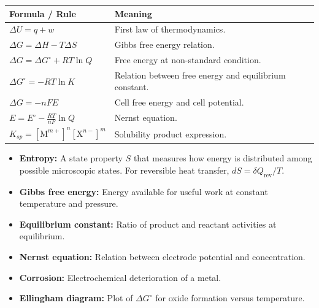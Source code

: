 \documentclass[12pt,a4paper]{article}
\begin{document}
\begin{tcolorbox}[formulabox, title={Key Formulas at a Glance}]
\begin{tabularx}{\linewidth}{|B{4.0cm}|Y|}
\hline
\textbf{Formula / Rule} & \textbf{Meaning} \\
\hline
$\Delta U=q+w$ & First law of thermodynamics. \\
\hline
$\Delta G=\Delta H-T\Delta S$ & Gibbs free energy relation. \\
\hline
$\Delta G=\Delta G^\circ+RT\ln Q$ & Free energy at non-standard condition. \\
\hline
$\Delta G^\circ=-RT\ln K$ & Relation between free energy and equilibrium constant. \\
\hline
$\Delta G=-nFE$ & Cell free energy and cell potential. \\
\hline
$E=E^\circ-\displaystyle\frac{RT}{nF}\ln Q$ & Nernst equation. \\
\hline
$K_{sp}=[\mathrm{M}^{m+}]^n[\mathrm{X}^{n-}]^m$ & Solubility product expression. \\
\hline
\end{tabularx}
\end{tcolorbox}

\begin{tcolorbox}[defbox, title={One-Line Definitions}]
\begin{itemize}[leftmargin=*, itemsep=2pt, topsep=2pt]
  \item \textbf{Entropy:} A state property $S$ that measures how energy is distributed among possible microscopic states. For reversible heat transfer, $dS=\delta Q_{\mathrm{rev}}/T$.
  \item \textbf{Gibbs free energy:} Energy available for useful work at constant temperature and pressure.
  \item \textbf{Equilibrium constant:} Ratio of product and reactant activities at equilibrium.
  \item \textbf{Nernst equation:} Relation between electrode potential and concentration.
  \item \textbf{Corrosion:} Electrochemical deterioration of a metal.
  \item \textbf{Ellingham diagram:} Plot of $\Delta G^\circ$ for oxide formation versus temperature.
\end{itemize}
\end{tcolorbox}
\end{document}
